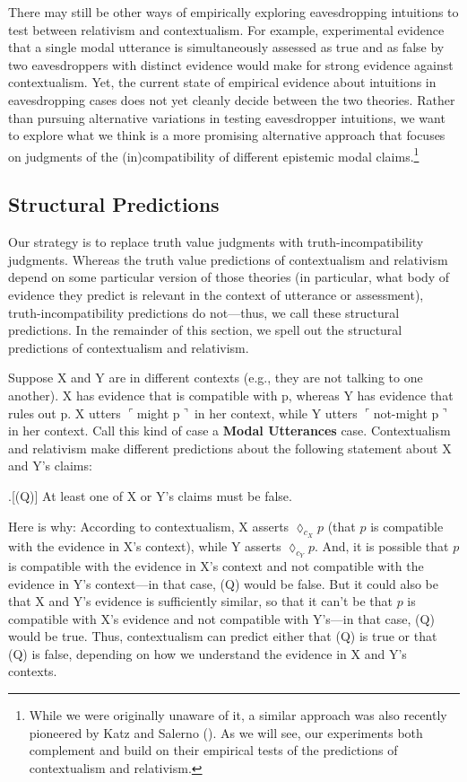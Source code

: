\documentclass[11pt]{article}
\newcommand{\ul}{$\ulcorner$}
\newcommand{\ur}{$\urcorner\ $}
\begin{document}
\begin{doublespace}
There may still be other ways of empirically exploring eavesdropping intuitions to test between relativism and contextualism. For example, experimental evidence that a single modal utterance is simultaneously assessed as true and as false by two eavesdroppers with distinct evidence would make for strong evidence against contextualism. Yet, the current state of empirical evidence about intuitions in eavesdropping cases does not yet cleanly decide between the two theories. Rather than pursuing alternative variations in testing eavesdropper intuitions, we want to explore what we think is a more promising alternative approach that focuses on judgments of the (in)compatibility of different epistemic modal claims.\footnote{While we were originally unaware of it, a similar approach was also recently pioneered by Katz and Salerno (\citeyear{katz:2017}). As we will see, our experiments both complement and build on their empirical tests of the predictions of contextualism and relativism.}


\subsection{Structural Predictions}
\label{1.2}

Our strategy is to replace truth value judgments with truth-incompatibility judgments. Whereas the truth value predictions of contextualism and relativism depend on some particular version of those theories (in particular, what body of evidence they predict is relevant in the context of utterance or assessment), truth-incompatibility predictions do not---thus, we call these structural predictions. In the remainder of this section, we spell out the structural predictions of contextualism and relativism.  \\


\noindent Suppose X and Y are in different contexts (e.g., they are not talking to one another). X has evidence that is compatible with p, whereas Y has evidence that rules out p. X utters \ul might p\ur in her context, while Y utters \ul not-might p\ur in her context. Call this kind of case a {\bf Modal Utterances} case. Contextualism and relativism make different predictions about the following statement about X and Y's claims:

\ex.[(Q)] At least one of X or Y's claims must be false.

Here is why: According to contextualism, X asserts $\lozenge_{c_X} p$ (that $p$ is compatible with the evidence in X's context), while Y asserts $\lozenge_{c_Y} p$. And, it is possible that $p$ is compatible with the evidence in X's context and not compatible with the evidence in Y's context---in that case, (Q) would be false. But it could also be that X and Y's evidence is sufficiently similar, so that it can't be that $p$ is compatible with X's evidence and not compatible with Y's---in that case, (Q) would be true. Thus, contextualism can predict either that (Q) is true or that (Q) is false, depending on how we understand the evidence in X and Y's contexts. 


\end{doublespace}
\end{document}
